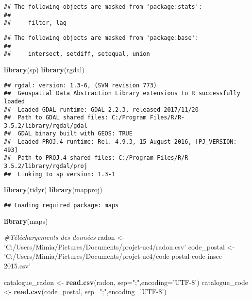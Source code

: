 \documentclass[]{article}
\newenvironment{Shaded}{\begin{snugshade}}{\end{snugshade}}
\newcommand{\KeywordTok}[1]{\textcolor[rgb]{0.13,0.29,0.53}{\textbf{#1}}}
\newcommand{\DataTypeTok}[1]{\textcolor[rgb]{0.13,0.29,0.53}{#1}}
\newcommand{\StringTok}[1]{\textcolor[rgb]{0.31,0.60,0.02}{#1}}
\newcommand{\CommentTok}[1]{\textcolor[rgb]{0.56,0.35,0.01}{\textit{#1}}}
\newcommand{\NormalTok}[1]{#1}
\begin{document}
\begin{verbatim}
## The following objects are masked from 'package:stats':
## 
##     filter, lag
\end{verbatim}

\begin{verbatim}
## The following objects are masked from 'package:base':
## 
##     intersect, setdiff, setequal, union
\end{verbatim}

\begin{Shaded}
\begin{Highlighting}[]
\KeywordTok{library}\NormalTok{(sp)}
\KeywordTok{library}\NormalTok{(rgdal)}
\end{Highlighting}
\end{Shaded}

\begin{verbatim}
## rgdal: version: 1.3-6, (SVN revision 773)
##  Geospatial Data Abstraction Library extensions to R successfully loaded
##  Loaded GDAL runtime: GDAL 2.2.3, released 2017/11/20
##  Path to GDAL shared files: C:/Program Files/R/R-3.5.2/library/rgdal/gdal
##  GDAL binary built with GEOS: TRUE 
##  Loaded PROJ.4 runtime: Rel. 4.9.3, 15 August 2016, [PJ_VERSION: 493]
##  Path to PROJ.4 shared files: C:/Program Files/R/R-3.5.2/library/rgdal/proj
##  Linking to sp version: 1.3-1
\end{verbatim}

\begin{Shaded}
\begin{Highlighting}[]
\KeywordTok{library}\NormalTok{(tidyr)}
\KeywordTok{library}\NormalTok{(mapproj)}
\end{Highlighting}
\end{Shaded}

\begin{verbatim}
## Loading required package: maps
\end{verbatim}

\begin{Shaded}
\begin{Highlighting}[]
\KeywordTok{library}\NormalTok{(maps)}
\end{Highlighting}
\end{Shaded}

\begin{Shaded}
\begin{Highlighting}[]
\CommentTok{#Téléchargements des données}
\NormalTok{radon <-}\StringTok{ 'C:/Users/Mimia/Pictures/Documents/projet-ue4/radon.csv'}
\NormalTok{code_postal <-}\StringTok{ 'C:/Users/Mimia/Pictures/Documents/projet-ue4/code-postal-code-insee-2015.csv'}

\NormalTok{catalogue_radon <-}\StringTok{ }\KeywordTok{read.csv}\NormalTok{(radon, }\DataTypeTok{sep=}\StringTok{";"}\NormalTok{,}\DataTypeTok{encoding=}\StringTok{'UTF-8'}\NormalTok{)}
\NormalTok{catalogue_code <-}\StringTok{ }\KeywordTok{read.csv}\NormalTok{(code_postal, }\DataTypeTok{sep=}\StringTok{";"}\NormalTok{,}\DataTypeTok{encoding=}\StringTok{'UTF-8'}\NormalTok{)}
\end{Highlighting}
\end{Shaded}
\end{document}

